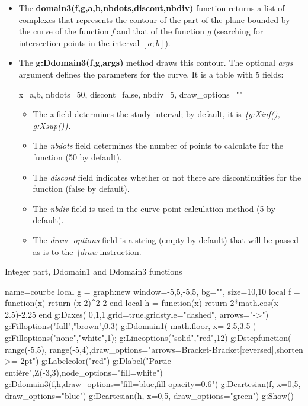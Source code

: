 \begin{itemize}
    \item The \textbf{domain3(f,g,a,b,nbdots,discont,nbdiv)} function returns a list of complexes that represents the contour of the part of the plane bounded by the curve of the function \emph{f} and that of the function \emph{g} (searching for intersection points in the interval $[a;b]$).

    \item The \textbf{g:Ddomain3(f,g,args)} method draws this contour. The optional \emph{args} argument defines the parameters for the curve. It is a table with 5 fields:

\begin{TeXcode}
{ x={a,b}, nbdots=50, discont=false, nbdiv=5, draw_options="" }
\end{TeXcode}

\begin{itemize}
    \item The \emph{x} field determines the study interval; by default, it is \emph{\{g:Xinf(), g:Xsup()\}}.
    \item The \emph{nbdots} field determines the number of points to calculate for the function (50 by default).
    \item The \emph{discont} field indicates whether or not there are discontinuities for the function (false by default).     \item The \emph{nbdiv} field is used in the curve point calculation method (5 by default).
    \item The \emph{draw\_options} field is a string (empty by default) that will be passed as is to the \emph{\textbackslash draw} instruction.
\end{itemize}
\end{itemize}

\begin{demo}{Integer part, Ddomain1 and Ddomain3 functions}
\begin{luadraw}{name=courbe}
local g = graph:new{ window={-5,5,-5,5}, bg="", size={10,10} }
local f = function(x) return (x-2)^2-2 end
local h = function(x) return 2*math.cos(x-2.5)-2.25 end
g:Daxes( {0,1,1},{grid=true,gridstyle="dashed", arrows="->"})
g:Filloptions("full","brown",0.3)
g:Ddomain1( math.floor, { x={-2.5,3.5} })
g:Filloptions("none","white",1); g:Lineoptions("solid","red",12)
g:Dstepfunction( {range(-5,5), range(-5,4)},{draw_options="arrows={Bracket-Bracket[reversed]},shorten >=-2pt"})
g:Labelcolor("red")
g:Dlabel("Partie entière",Z(-3,3),{node_options="fill=white"})
g:Ddomain3(f,h,{draw_options="fill=blue,fill opacity=0.6"})
g:Dcartesian(f, {x={0,5}, draw_options="blue"})
g:Dcartesian(h, {x={0,5}, draw_options="green"})
g:Show()
\end{luadraw}
\end{demo}

